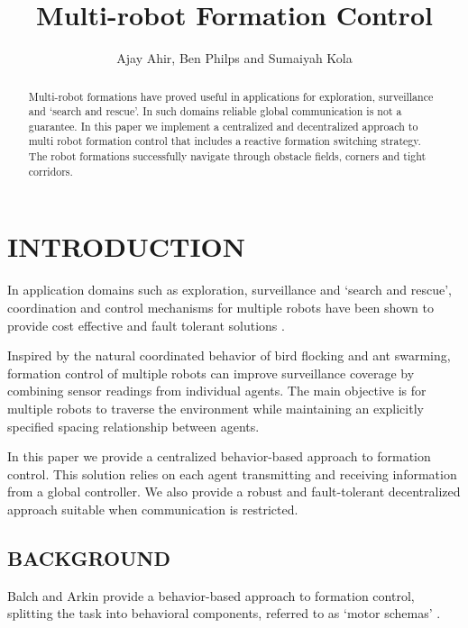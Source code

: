 \documentclass[letterpaper, 10 pt, conference]{ieeeconf}  %
\title{\LARGE \bf Multi-robot Formation Control}
\author{Ajay Ahir, Ben Philps and Sumaiyah Kola}
\begin{document}
\maketitle
\thispagestyle{empty}
\pagestyle{empty}

\begin{abstract}
	
Multi-robot formations have proved useful in applications for exploration, surveillance and `search and rescue'. In such domains reliable global communication is not a guarantee. In this paper we implement a centralized and decentralized approach to multi robot formation control that includes a reactive formation switching strategy. The robot formations successfully navigate through obstacle fields, corners and tight corridors.

\end{abstract}
	
\section{INTRODUCTION}
	
In application domains such as exploration, surveillance and `search and rescue', coordination and control mechanisms for multiple robots have been shown to provide cost effective and fault tolerant solutions \cite{c1}.

Inspired by the natural coordinated behavior of bird flocking and ant swarming, formation control of multiple robots can improve surveillance coverage by combining sensor readings from individual agents. The main objective is for multiple robots to traverse the environment while maintaining an explicitly specified spacing relationship between agents.

In this paper we provide a centralized behavior-based approach to formation control. This solution relies on each agent transmitting and receiving information from a global controller. We also provide a robust and fault-tolerant decentralized approach suitable when communication is restricted.

\subsection{BACKGROUND}
\label{background}

Balch and Arkin provide a behavior-based approach to formation control, splitting the task into behavioral components, referred to as `motor schemas' \cite{c2}. 
\end{document}
